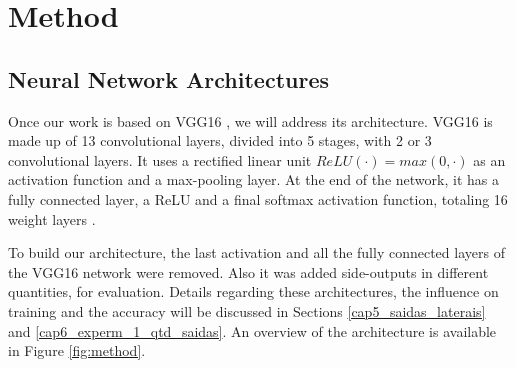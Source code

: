 \section{Method}
\label{cap5_metodologia}

\subsection{Neural Network Architectures}
\label{cap5_rede_neural}

Once our work is based on VGG16 \cite{VGGNET:2014}, we will address its architecture.
VGG16 is made up of 13 convolutional layers, divided into 5 stages, with 2 or 3 convolutional layers.
It uses a rectified linear unit $ReLU(\cdot) = max(0, \cdot)$ as an activation function and a max-pooling layer.
At the end of the network, it has a fully connected layer, a ReLU and a final softmax activation function, totaling 16 weight layers \cite{VGGNET:2014}.


To build our architecture, the last activation and all the fully connected layers of the VGG16 network were removed.
Also it was added side-outputs in different quantities, for evaluation.
Details regarding these architectures, the influence on training and the accuracy will be discussed in Sections \ref{cap5_saidas_laterais} and \ref{cap6_experm_1_qtd_saidas}.
An overview of the architecture is available in Figure \ref{fig:method}.

